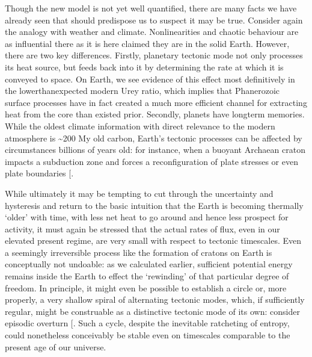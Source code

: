 \documentclass[letterpaper,10pt,english]{jupyterBook}
\begin{document}
\sphinxAtStartPar
Though the new model is not yet well quantified, there are many facts we have already seen that should predispose us to suspect it may be true. Consider again the analogy with weather and climate. Non\sphinxhyphen{}linearities and chaotic behaviour are as influential there as it is here claimed they are in the solid Earth. However, there are two key differences. Firstly, planetary tectonic mode not only processes its heat source, but feeds back into it by determining the rate at which it is conveyed to space. On Earth, we see evidence of this effect most definitively in the lower\sphinxhyphen{}than\sphinxhyphen{}expected modern Urey ratio, which implies that Phanerozoic surface processes have in fact created a much more efficient channel for extracting heat from the core than existed prior. Secondly, planets have long\sphinxhyphen{}term memories. While the oldest climate information with direct relevance to the modern atmosphere is \textasciitilde{}200 My old carbon, Earth’s tectonic processes can be affected by circumstances billions of years old: for instance, when a buoyant Archaean craton impacts a subduction zone and forces a reconfiguration of plate stresses or even plate boundaries {[}\sphinxcite{references:id581}{]}.

\sphinxAtStartPar
While ultimately it may be tempting to cut through the uncertainty and hysteresis and return to the basic intuition that the Earth is becoming thermally ‘older’ with time, with less net heat to go around and hence less prospect for activity, it must again be stressed that the actual rates of flux, even in our elevated present regime, are very small with respect to tectonic timescales. Even a seemingly irreversible process like the formation of cratons on Earth is conceptually not undoable: as we calculated earlier, sufficient potential energy remains inside the Earth to effect the ‘rewinding’ of that particular degree of freedom. In principle, it might even be possible to establish a circle \sphinxhyphen{} or, more properly, a very shallow spiral \sphinxhyphen{} of alternating tectonic modes, which, if sufficiently regular, might be construable as a distinctive tectonic mode of its own: consider episodic overturn {[}\sphinxcite{references:id759}{]}. Such a cycle, despite the inevitable ratcheting of entropy, could nonetheless conceivably be stable even on timescales comparable to the present age of our universe.
\end{document}
